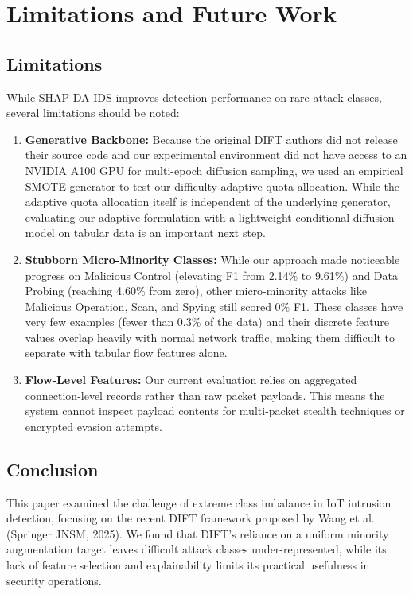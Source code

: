 \section{Limitations and Future Work}
\label{sec:limitations}

\subsection{Limitations}
While SHAP-DA-IDS improves detection performance on rare attack classes, several limitations should be noted:
\begin{enumerate}
    \item \textbf{Generative Backbone:} Because the original DIFT authors did not release their source code and our experimental environment did not have access to an NVIDIA A100 GPU for multi-epoch diffusion sampling, we used an empirical SMOTE generator to test our difficulty-adaptive quota allocation. While the adaptive quota allocation itself is independent of the underlying generator, evaluating our adaptive formulation with a lightweight conditional diffusion model on tabular data is an important next step.
    \item \textbf{Stubborn Micro-Minority Classes:} While our approach made noticeable progress on Malicious Control (elevating F1 from 2.14\% to 9.61\%) and Data Probing (reaching 4.60\% from zero), other micro-minority attacks like Malicious Operation, Scan, and Spying still scored 0\% F1. These classes have very few examples (fewer than 0.3\% of the data) and their discrete feature values overlap heavily with normal network traffic, making them difficult to separate with tabular flow features alone.
    \item \textbf{Flow-Level Features:} Our current evaluation relies on aggregated connection-level records rather than raw packet payloads. This means the system cannot inspect payload contents for multi-packet stealth techniques or encrypted evasion attempts.
\end{enumerate}

\subsection{Conclusion}
This paper examined the challenge of extreme class imbalance in IoT intrusion detection, focusing on the recent DIFT framework proposed by Wang et al. (Springer JNSM, 2025). We found that DIFT's reliance on a uniform minority augmentation target leaves difficult attack classes under-represented, while its lack of feature selection and explainability limits its practical usefulness in security operations.

